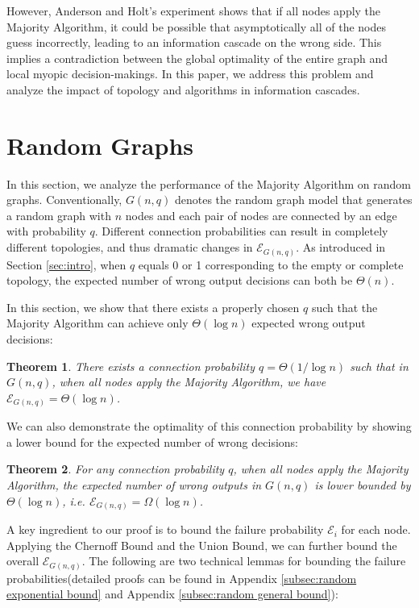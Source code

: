 \documentclass[a4paper,UKenglish]{lipics}
\newtheorem{thm}{Theorem}[section] %
\theoremstyle{definition}
\begin{document}
However, Anderson and Holt's experiment shows that if all nodes apply the Majority Algorithm, 
	it could be possible that asymptotically all of the nodes guess incorrectly, 
	leading to an information cascade on the wrong side. 
This implies a contradiction between the global optimality of the entire graph and local myopic decision-makings.
In this paper, we address this problem and analyze the impact of topology and algorithms in information cascades.









\section{Random Graphs}
In this section, we analyze the performance of the Majority Algorithm on random graphs.
Conventionally, $G(n, q)$ denotes the random graph model that generates a random graph with $n$ nodes and each pair of nodes are connected by an edge with probability $q$.
Different connection probabilities can result in completely different topologies, and thus dramatic changes in $\mathcal{E}_{G(n,q)}$.
As introduced in Section \ref{sec:intro}, when $q$ equals 0 or 1 corresponding to the empty or complete topology, the expected number of wrong output decisions can both be $\Theta(n)$.

In this section, we show that there exists a properly chosen $q$ such that the Majority Algorithm can achieve only $\Theta(\log n)$ expected wrong output decisions:

\begin{thm}
\label{thm:random graph log n reachable}
There exists a connection probability $q = \Theta(1/\log n)$ such that in $G(n, q)$, when all nodes apply the Majority Algorithm, we have $\mathcal{E}_{G(n,q)} = \Theta(\log n)$.
\end{thm}


We can also demonstrate the optimality of this connection probability by showing a lower bound for the expected number of wrong decisions:

\begin{thm}
\label{thm:random graph log n bound}
For any connection probability $q$, when all nodes apply the Majority Algorithm, the expected number of wrong outputs in $G(n,q)$ is lower bounded by $\Theta(\log n)$, i.e. $\mathcal{E}_{G(n,q)} = \Omega(\log n)$.
\end{thm}
A key ingredient to our proof is to bound the failure probability $\mathcal{E}_i$ for each node. Applying the Chernoff Bound and the Union Bound, we can further bound the overall $\mathcal{E}_{G(n,q)}$. The following are two technical lemmas for bounding the failure probabilities(detailed proofs can be found in Appendix \ref{subsec:random exponential bound} and Appendix \ref{subsec:random general bound}):
\end{document}
